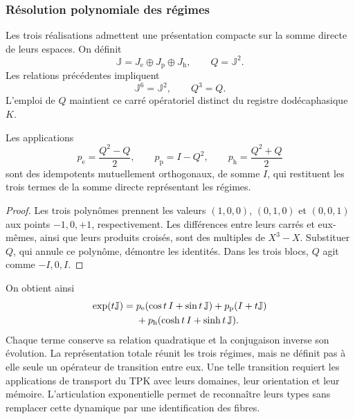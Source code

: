 \subsubsection{Résolution polynomiale des régimes}

Les trois réalisations admettent une présentation compacte sur la somme
directe de leurs espaces. On définit
\[
 \mathbb J=J_{\mathrm e}\oplus J_{\mathrm p}\oplus J_{\mathrm h},
 \qquad Q=\mathbb J^2.
\]
Les relations précédentes impliquent
\[
 \mathbb J^6=\mathbb J^2,\qquad Q^3=Q.
\]
L’emploi de \(Q\) maintient ce carré opératoriel distinct du registre
dodécaphasique \(K\).

\begin{proposition}
\label{geo-euler-trit-proyectores}
Les applications
\[
 p_{\mathrm e}=\frac{Q^2-Q}{2},\qquad
 p_{\mathrm p}=I-Q^2,\qquad
 p_{\mathrm h}=\frac{Q^2+Q}{2}
\]
sont des idempotents mutuellement orthogonaux, de somme \(I\), qui restituent les trois
termes de la somme directe représentant les régimes.
\end{proposition}
\begin{proof}
Les trois polynômes prennent les valeurs \((1,0,0)\), \((0,1,0)\) et
\((0,0,1)\) aux points \(-1,0,+1\), respectivement. Les différences
entre leurs carrés et eux-mêmes, ainsi que leurs produits croisés, sont
des multiples de \(X^3-X\). Substituer \(Q\), qui annule ce polynôme, démontre
les identités. Dans les trois blocs, \(Q\) agit comme \(-I,0,I\).
\end{proof}

On obtient ainsi
\begin{align}
 \exp(t\mathbb J)
 ={}&p_{\mathrm e}(\cos t\,I+\sin t\,\mathbb J)
   +p_{\mathrm p}(I+t\mathbb J)\notag\\
   &+p_{\mathrm h}(\cosh t\,I+\sinh t\,\mathbb J).
 \label{geo-euler-trit-exponencial-total}
\end{align}
Chaque terme conserve sa relation quadratique et la conjugaison inverse
son évolution. La représentation totale réunit les trois régimes, mais ne
définit pas à elle seule un opérateur de transition entre eux. Une telle transition
requiert les applications de transport du TPK avec leurs domaines, leur orientation et
leur mémoire. L’articulation exponentielle permet de reconnaître leurs types sans
remplacer cette dynamique par une identification des fibres.

